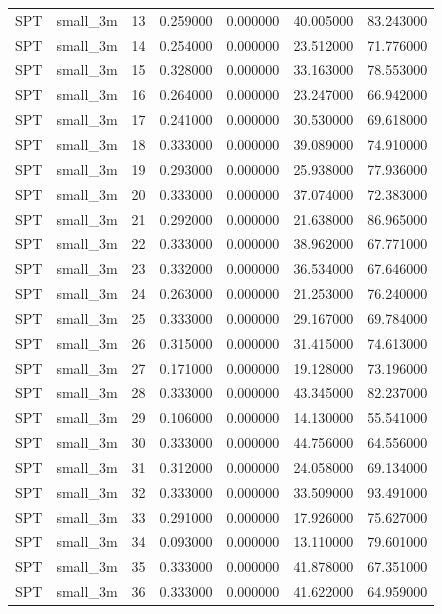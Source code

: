 \begin{tabular}{llrrrrr}
SPT & small_3m & 13 & 0.259000 & 0.000000 & 40.005000 & 83.243000 \\
SPT & small_3m & 14 & 0.254000 & 0.000000 & 23.512000 & 71.776000 \\
SPT & small_3m & 15 & 0.328000 & 0.000000 & 33.163000 & 78.553000 \\
SPT & small_3m & 16 & 0.264000 & 0.000000 & 23.247000 & 66.942000 \\
SPT & small_3m & 17 & 0.241000 & 0.000000 & 30.530000 & 69.618000 \\
SPT & small_3m & 18 & 0.333000 & 0.000000 & 39.089000 & 74.910000 \\
SPT & small_3m & 19 & 0.293000 & 0.000000 & 25.938000 & 77.936000 \\
SPT & small_3m & 20 & 0.333000 & 0.000000 & 37.074000 & 72.383000 \\
SPT & small_3m & 21 & 0.292000 & 0.000000 & 21.638000 & 86.965000 \\
SPT & small_3m & 22 & 0.333000 & 0.000000 & 38.962000 & 67.771000 \\
SPT & small_3m & 23 & 0.332000 & 0.000000 & 36.534000 & 67.646000 \\
SPT & small_3m & 24 & 0.263000 & 0.000000 & 21.253000 & 76.240000 \\
SPT & small_3m & 25 & 0.333000 & 0.000000 & 29.167000 & 69.784000 \\
SPT & small_3m & 26 & 0.315000 & 0.000000 & 31.415000 & 74.613000 \\
SPT & small_3m & 27 & 0.171000 & 0.000000 & 19.128000 & 73.196000 \\
SPT & small_3m & 28 & 0.333000 & 0.000000 & 43.345000 & 82.237000 \\
SPT & small_3m & 29 & 0.106000 & 0.000000 & 14.130000 & 55.541000 \\
SPT & small_3m & 30 & 0.333000 & 0.000000 & 44.756000 & 64.556000 \\
SPT & small_3m & 31 & 0.312000 & 0.000000 & 24.058000 & 69.134000 \\
SPT & small_3m & 32 & 0.333000 & 0.000000 & 33.509000 & 93.491000 \\
SPT & small_3m & 33 & 0.291000 & 0.000000 & 17.926000 & 75.627000 \\
SPT & small_3m & 34 & 0.093000 & 0.000000 & 13.110000 & 79.601000 \\
SPT & small_3m & 35 & 0.333000 & 0.000000 & 41.878000 & 67.351000 \\
SPT & small_3m & 36 & 0.333000 & 0.000000 & 41.622000 & 64.959000 \\

\end{tabular}
